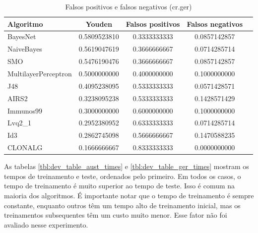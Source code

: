 \vspace{0.5cm}
\begin{table}[h!]
    \centering
    \caption{Falsos positivos e falsos negativos (cr.ger)}
    \label{tbl:dev_table_ger_youden}
    \vspace{0.5cm}
    \begin{tabular}{|l|c|c|c|c|}
        \hline
        \textbf{Algoritmo} & \textbf{Youden} & \textbf{Falsos positivos} & \textbf{Falsos negativos} \\
        \hline
        \rowcolor[gray]{.9}
        BayesNet             & 0.5809523810 & 0.3333333333 & 0.0857142857 \\ \hline
        \rowcolor[gray]{.9}
        NaiveBayes           & 0.5619047619 & 0.3666666667 & 0.0714285714 \\ \hline
        \rowcolor[gray]{.9}
        SMO                  & 0.5476190476 & 0.3666666667 & 0.0857142857 \\ \hline
        MultilayerPerceptron & 0.5000000000 & 0.4000000000 & 0.1000000000 \\ \hline
        J48                  & 0.4095238095 & 0.5333333333 & 0.0571428571 \\ \hline
        AIRS2                & 0.3238095238 & 0.5333333333 & 0.1428571429 \\ \hline
        Immunos99            & 0.3000000000 & 0.6000000000 & 0.1000000000 \\ \hline
        Lvq2\_1              & 0.2952380952 & 0.6333333333 & 0.0714285714 \\ \hline
        Id3                  & 0.2862745098 & 0.5666666667 & 0.1470588235 \\ \hline
        CLONALG              & 0.1666666667 & 0.8333333333 & 0.0000000000 \\ \hline
    \end{tabular}
\end{table}
\vspace{0.5cm}

As tabelas \ref{tbl:dev_table_aust_times} e \ref{tbl:dev_table_ger_times} mostram os tempos de treinamento e teste, ordenados pelo primeiro. Em todos os casos, o tempo de treinamento é muito superior ao tempo de teste. Isso é comum na maioria dos algoritmos. É importante notar que o tempo de treinamento é sempre constante, enquanto outros têm um tempo alto de treinamento inicial, mas os treinamentos subsequentes têm um custo muito menor. Esse fator não foi avaliado nesse experimento.

